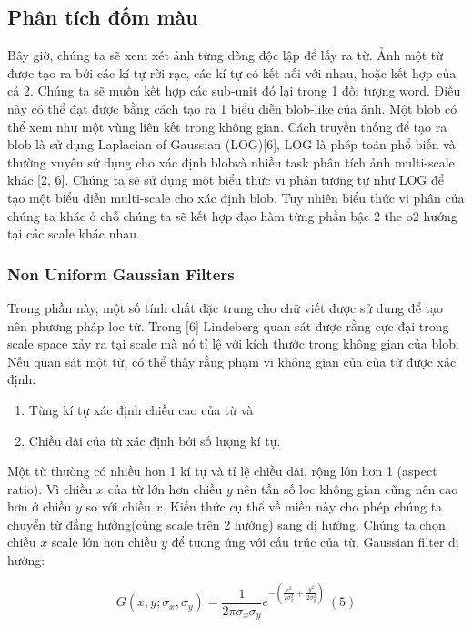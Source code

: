 \documentclass[a4paper]{article}
\begin{document}
\subsection{Phân tích đốm màu}
Bây giờ, chúng ta sẽ xem xét ảnh từng dòng độc lập để lấy ra từ. Ảnh một từ được tạo ra bởi các kí tự rời rạc, các kí tự có kết nối với nhau, hoặc kết hợp của cả 2. Chúng ta sẽ muốn kết hợp các sub-unit đó lại trong 1 đối tượng word. Điều này có thể đạt được bằng cách tạo ra 1 biểu diễn blob-like của ảnh. Một blob có thể xem như một vùng liên kết trong không gian. Cách truyền thống để tạo ra blob là sử dụng Laplacian of Gaussian (LOG)[6], LOG là phép toán phổ biến và thường xuyên sử dụng cho xác định blobvà nhiều task phân tích ảnh multi-scale khác [2, 6]. Chúng ta sẽ sử dụng một biểu thức vi phân tương tự như LOG để tạo một biểu diễn multi-scale cho xác định blob. Tuy nhiên biểu thức vi phân của chúng ta khác ở chỗ chúng ta sẽ kết hợp đạo hàm từng phần bậc 2 the o2 hướng tại các scale khác nhau.

\subsubsection*{Non Uniform Gaussian Filters}
Trong phần này, một số tính chất đặc trung cho chữ viết được sử dụng để tạo nên phương pháp lọc từ. Trong [6] Lindeberg quan sát được rằng cực đại trong scale space xảy ra tại scale mà nó tỉ lệ với kích thước trong không gian của blob. Nếu quan sát một từ, có thể thấy rằng phạm vi không gian của của từ được xác định:
\begin{enumerate}
    \item Từng kí tự xác định chiều cao của từ và
    \item Chiều dài của từ xác định bởi số lượng kí tự.
\end{enumerate}
Một từ thường có nhiều hơn 1 kí tự và tỉ lệ chiều dài, rộng lớn hơn 1 (aspect ratio). Vì chiều $x$  của từ lớn hơn chiều $y$ nên tần số lọc không gian cũng nên cao hơn ở chiều $y$ so với chiều $x$. Kiến thức cụ thể về miền này cho phép chúng ta chuyển từ đẳng hướng(cùng scale trên 2 hướng) sang dị hướng. Chúng ta chọn chiều $x$  scale lớn hơn chiều $y$ để tương ứng với cấu trúc của từ. Gaussian filter dị hướng:

\begin{equation}
    G(x, y; \sigma_x, \sigma_y) = \frac 1{2\pi \sigma_x\sigma_y} e^{-(\frac {x^2}{2\sigma_x^2}+ \frac {y^2}{2\sigma_y^2})}~ (5)
\end{equation}
\end{document}
